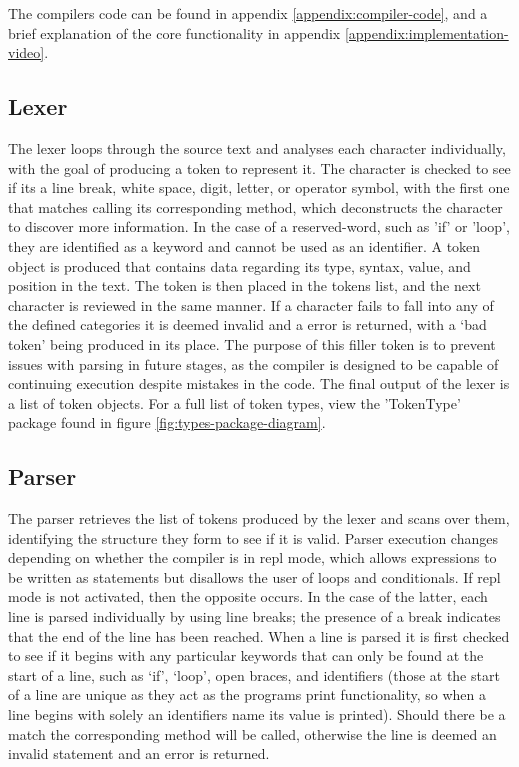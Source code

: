 \documentclass[
]{report}
\begin{document}
The compilers code can be found in appendix \ref{appendix:compiler-code}, and a brief
explanation of the core functionality in appendix \ref{appendix:implementation-video}.

\subsection{Lexer}
The lexer loops through the source text and analyses each character
individually, with the goal of producing a \gls{token} to represent it. The
character is checked to see if its a line break, white space, digit,
letter, or operator \gls{symbol}, with the first one that matches calling its
corresponding method, which deconstructs the character to discover more
information. In the case of a \gls{reserved-word}, such as 'if' or 'loop',
they are identified as a \gls{keyword} and cannot be used as an \gls{identifier}.
A \gls{token} object is produced that contains data regarding its
type, syntax, value, and position in the text. The \gls{token} is then placed
in the \glspl{token} list, and the next character is reviewed in the same
manner. If a character fails to fall into any of the defined categories
it is deemed invalid and a error is returned, with a `bad \gls{token}' being
produced in its place. The purpose of this filler \gls{token} is to prevent
issues with \gls{parsing} in future stages, as the compiler is designed to be
capable of continuing execution despite mistakes in the code. The final
output of the lexer is a list of \gls{token} objects. For a full list of token types,
view the 'TokenType' package found in figure \ref{fig:types-package-diagram}.

\subsection{Parser}
The parser retrieves the list of \glspl{token} produced by the lexer and scans
over them, identifying the structure they form to see if it is valid.
Parser execution changes depending on whether the compiler is in \acrshort{repl}
mode, which allows \glspl{expression} to be written as \glspl{statement} but disallows
the user of loops and conditionals. If \acrshort{repl} mode is not activated, then
the opposite occurs. In the case of the latter, each line is parsed
individually by using line breaks; the presence of a break indicates
that the end of the line has been reached. When a line is parsed it is
first checked to see if it begins with any particular \glspl{keyword} that can
only be found at the start of a line, such as `if', `loop', open braces,
and \glspl{identifier} (those at the start of a line are unique as they act as
the programs print functionality, so when a line begins with solely an
\glspl{identifier} name its value is printed). Should there be a match the
corresponding method will be called, otherwise the line is deemed an
invalid \gls{statement} and an error is returned.
\end{document}
